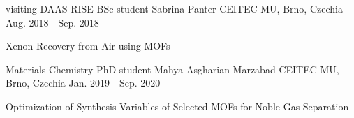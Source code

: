 \begin{cventries}
    \cventry
    {visiting DAAS-RISE BSc student} %
    {Sabrina Panter} %
    {CEITEC-MU, Brno, Czechia} %
    {Aug. 2018 - Sep. 2018} %
    {
      \begin{cvitems} %
        \item {Xenon Recovery from Air using MOFs}
      \end{cvitems}
    }
    \cventry
    {Materials Chemistry PhD student} %
    {Mahya Asgharian Marzabad} %
    {CEITEC-MU, Brno, Czechia} %
    {Jan. 2019 - Sep. 2020} %
    {
      \begin{cvitems} %
        \item {Optimization of Synthesis Variables of Selected MOFs for Noble Gas Separation}
      \end{cvitems}
    }
  
\end{cventries}
